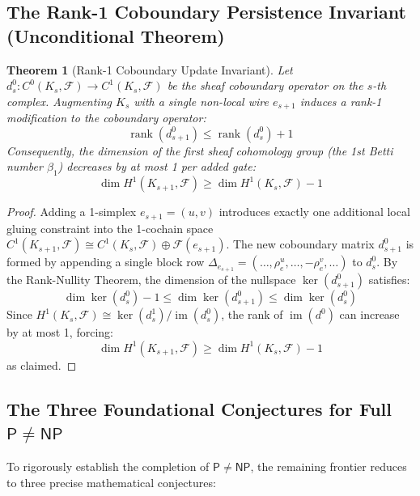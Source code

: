 \documentclass[11pt,a4paper]{article}
\newtheorem{theorem}{Theorem}[section]
\theoremstyle{definition}
\theoremstyle{remark}
\newcommand{\NP}{\mathsf{NP}}
\newcommand{\PP}{\mathsf{P}}
\begin{document}
\subsection{The Rank-1 Coboundary Persistence Invariant (Unconditional Theorem)}

\begin{theorem}[Rank-1 Coboundary Update Invariant]\label{thm:rank1_update}
Let $d^0_s: C^0(K_s, \mathcal{F}) \to C^1(K_s, \mathcal{F})$ be the sheaf coboundary operator on the $s$-th complex. 
Augmenting $K_s$ with a single non-local wire $e_{s+1}$ induces a rank-1 modification to the coboundary operator:
\[
\operatorname{rank}(d^0_{s+1}) \le \operatorname{rank}(d^0_s) + 1
\]
Consequently, the dimension of the first sheaf cohomology group (the 1st Betti number $\beta_1$) decreases by at most 1 per added gate:
\[
\dim H^1(K_{s+1}, \mathcal{F}) \ge \dim H^1(K_s, \mathcal{F}) - 1
\]
\end{theorem}

\begin{proof}
Adding a 1-simplex $e_{s+1} = (u, v)$ introduces exactly one additional local gluing constraint into the 1-cochain space $C^1(K_{s+1}, \mathcal{F}) \cong C^1(K_s, \mathcal{F}) \oplus \mathcal{F}(e_{s+1})$. 
The new coboundary matrix $d^0_{s+1}$ is formed by appending a single block row $\Delta_{e_{s+1}} = (\dots, \rho_e^u, \dots, -\rho_e^v, \dots)$ to $d^0_s$. 
By the Rank-Nullity Theorem, the dimension of the nullspace $\ker(d^0_{s+1})$ satisfies:
\[
\dim \ker(d^0_s) - 1 \le \dim \ker(d^0_{s+1}) \le \dim \ker(d^0_s)
\]
Since $H^1(K_s, \mathcal{F}) \cong \ker(d^1_s) / \operatorname{im}(d^0_s)$, the rank of $\operatorname{im}(d^0)$ can increase by at most 1, forcing:
\[
\dim H^1(K_{s+1}, \mathcal{F}) \ge \dim H^1(K_s, \mathcal{F}) - 1
\]
as claimed.
\end{proof}

\subsection{The Three Foundational Conjectures for Full $\PP \neq \NP$}

To rigorously establish the completion of $\PP \neq \NP$, the remaining frontier reduces to three precise mathematical conjectures:

\begin{center}
\end{center}
\end{document}
